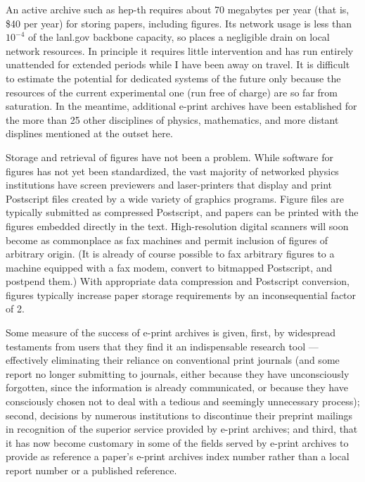 An active archive such as hep-th requires about 70 megabytes per year (that is,
\$40 per year) for storing papers, including figures. Its network usage is less
than $10^{-4}$ of the lanl.gov backbone capacity, so places a negligible drain
on local network resources. In principle it requires little intervention and
has run entirely unattended for extended periods while I have been away on
travel. It is difficult to estimate the potential for dedicated systems of the
future only because the resources of the current experimental one (run free of
charge) are so far from saturation. In the meantime, additional e-print
archives have been established for the more than 25 other disciplines of
physics, mathematics, and more distant displines mentioned at the outset here.

Storage and retrieval of figures have not been a problem. While
software for figures has not yet been standardized, the vast majority of
networked physics institutions have screen previewers and laser-printers that
display and print Postscript files created by a wide variety of graphics
programs. Figure files are typically submitted as compressed
Postscript, and papers can be printed with the figures embedded directly in the
text. High-resolution digital scanners will soon become as commonplace as fax
machines and permit inclusion of figures of arbitrary origin.
(It is already of course possible to fax arbitrary figures to a machine
equipped with a fax modem, convert to bitmapped Postscript, and postpend them.)
With appropriate data compression and Postscript conversion, figures typically
increase paper storage requirements by an inconsequential factor of 2.

Some measure of the success of e-print archives is given, first, by widespread
testaments from users that they find it an indispensable research tool
--- effectively eliminating their reliance on conventional print journals
(and some report no longer submitting to journals, either because they have
unconsciously forgotten, since the information is already communicated,
or because they have consciously chosen not to deal with a tedious and
seemingly unnecessary process);
second, decisions by numerous institutions to discontinue their preprint
mailings in recognition of the superior service provided by e-print archives;
and third, that it has now become customary in some of the fields served by
e-print archives to provide as reference a paper's e-print archives index
number rather than a local report number or a published reference.


